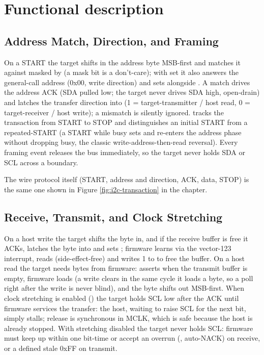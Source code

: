 \section{Functional description}

\subsection{Address Match, Direction, and Framing}

On a START the target shifts in the address byte MSB-first and matches it against  masked by  (a mask bit is a don't-care); with  set it also answers the general-call address (0x00, write direction) and sets  alongside . A match drives the address ACK (SDA pulled low; the target never drives SDA high, open-drain) and latches the transfer direction into  (1 = target-transmitter / host read, 0 = target-receiver / host write); a mismatch is silently ignored.  tracks the transaction from START to STOP and distinguishes an initial START from a repeated-START (a START while busy sets  and re-enters the address phase without dropping busy, the classic write-address-then-read reversal). Every framing event releases the bus immediately, so the target never holds SDA or SCL across a boundary.

The wire protocol itself (START, address and direction, ACK, data, STOP) is the same one shown in Figure \ref{fig:i2c-transaction} in the  chapter.

\subsection{Receive, Transmit, and Clock Stretching}

On a host write the target shifts the byte in, and if the receive buffer is free it ACKs, latches the byte into  and sets ; firmware learns via the vector-123 interrupt, reads  (side-effect-free) and writes 1 to  to free the buffer. On a host read the target needs bytes from firmware:  asserts when the transmit buffer is empty, firmware loads  (a write clears  in the same cycle it loads a byte, so a poll right after the write is never blind), and the byte shifts out MSB-first. When clock stretching is enabled () the target holds SCL low after the ACK until firmware services the transfer: the host, waiting to raise SCL for the next bit, simply stalls; release is synchronous in MCLK, which is safe because the host is already stopped. With stretching disabled the target never holds SCL: firmware must keep up within one bit-time or accept an overrun (, auto-NACK) on receive, or a defined stale 0xFF on transmit.

